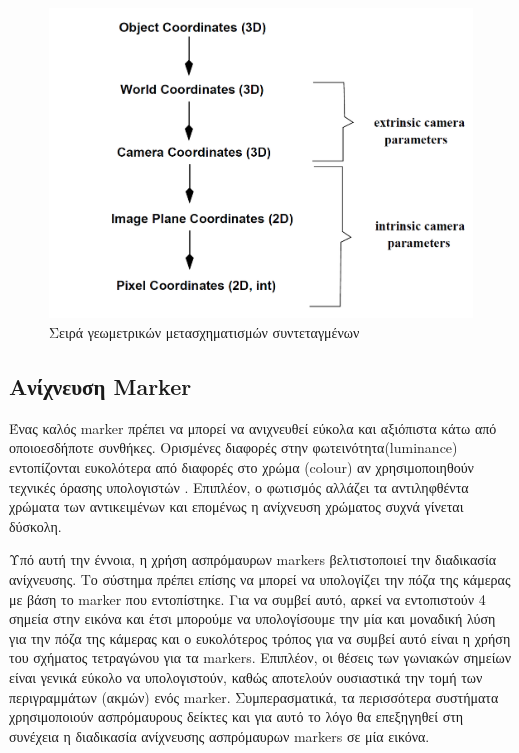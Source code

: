 \begin{figure}[H]
    \centering
    \includegraphics[scale=0.6, angle=0]{Files/Figures/coordinatesDiagram.png}
    \caption[Σειρά γεωμετρικών μετασχηματισμών συντεταγμένων]{Σειρά γεωμετρικών μετασχηματισμών συντεταγμένων}
    \label{fig:coordinatesDiagram}
\end{figure} \label{ssec:markerpose}



\subsection{Ανίχνευση Marker}


Ένας καλός marker πρέπει να μπορεί να ανιχνευθεί εύκολα και αξιόπιστα κάτω από οποιοεσδήποτε συνθήκες. 
Ορισμένες διαφορές στην φωτεινότητα(luminance) εντοπίζονται ευκολότερα από διαφορές στο χρώμα (colour) αν χρησιμοποιηθούν τεχνικές όρασης υπολογιστών \cite{hartley2003multiple}. Επιπλέον, ο φωτισμός αλλάζει τα αντιληφθέντα χρώματα των αντικειμένων και επομένως η ανίχνευση χρώματος συχνά γίνεται δύσκολη. 
 


Υπό αυτή την έννοια, η χρήση ασπρόμαυρων markers βελτιστοποιεί την διαδικασία ανίχνευσης. Το σύστημα πρέπει επίσης να μπορεί να υπολογίζει την πόζα της κάμερας με βάση το marker που εντοπίστηκε. Για να συμβεί αυτό, αρκεί να εντοπιστούν 4 σημεία στην εικόνα και έτσι μπορούμε να υπολογίσουμε την μία και μοναδική λύση για την πόζα της κάμερας και ο ευκολότερος τρόπος για να συμβεί αυτό είναι η χρήση του σχήματος τετραγώνου για τα markers. 
Επιπλέον, οι θέσεις των γωνιακών σημείων είναι γενικά εύκολο να υπολογιστούν, καθώς αποτελούν ουσιαστικά την τομή των περιγραμμάτων (ακμών) ενός marker. Συμπερασματικά, τα περισσότερα συστήματα χρησιμοποιούν ασπρόμαυρους δείκτες και για αυτό το λόγο θα επεξηγηθεί στη συνέχεια η διαδικασία ανίχνευσης ασπρόμαυρων markers σε μία εικόνα.    




